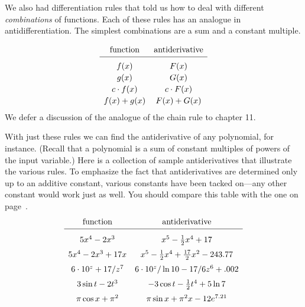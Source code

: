 We also had differentiation rules that told us how to deal with
different {\em combinations\/} of functions.  Each of these rules has
an analogue in antidifferentiation.  The simplest combinations are a
sum and a constant multiple.



\mbox{}



        \addtolength{\arraycolsep}{15pt}
        \[
\begin{array}{cc}
        \mbox{function} & \mbox{antiderivative} \\[2pt] \hline
        \rule{0pt}{14pt} f(x) \rule{0pt}{14pt} & F(x) \\[2pt]
        g(x) & G(x) \\[2pt]
        c \cdot f(x) & c \cdot F(x) \\[2pt]
        f(x) + g(x) & F(x) + G(x) 
        \end{array}
\]
        \addtolength{\arraycolsep}{-15pt}
We defer a discussion of the analogue of the chain rule to chapter 11.

With just these rules we can find the antiderivative of any
polynomial, for instance.  (Recall that a polynomial is a sum of
constant multiples of powers of the input variable.)  Here is a
collection of sample antiderivatives that illustrate the various
rules.  To emphasize the fact that antiderivatives are determined only
up to an additive constant, various constants have been tacked
on---any other constant would work just as well.  You should compare
this table with the one on page~\pageref{deriv table}.\label{antideriv
  table} \addtolength{\arraycolsep}{8pt}
        \[
\begin{array}{cc}
        \mbox{function} & \mbox{antiderivative} \\[2pt] \hline
        \rule{0pt}{16pt} 5x^4 - 2x^3\rule{0pt}{16pt} & 
                x^5 - \frac{1}{2}x^4 +17 \\[6pt]
        5x^4 - 2x^3 + 17x & 
                x^5 - \frac{1}{2}x^4 + \frac{17}{2}x^2 -243.77 \\[6pt]
        6 \cdot 10^z + 17/z^7 & 
                 6 \cdot 10^z/\ln{10} -  17/6z^6 +.002 \\[6pt]
        3\sin{t} - 2t^3 & -3\cos{t} - \frac{1}{2}t^4 +5\ln{7} \\[6pt]
        \pi\cos{x} + \pi^2 & \pi\sin{x} + \pi^2 x  - 12e^{7.21}
        \end{array}
\]
        \addtolength{\arraycolsep}{-8pt}


